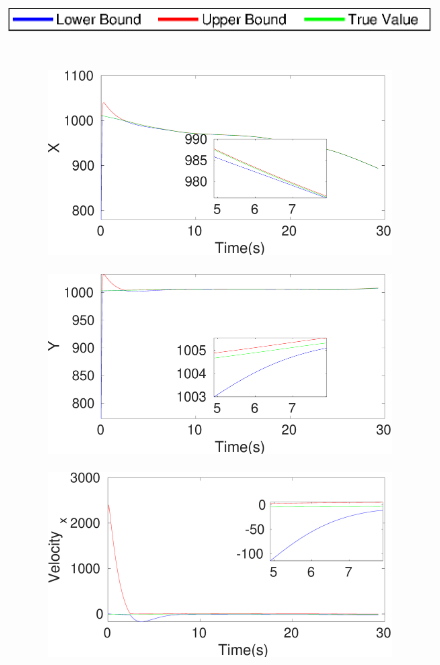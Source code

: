 \begin{figure}[h]
\includegraphics[scale=0.8]{figures/legend}\\\\
\begin{subfigure}{.5\linewidth}
\centering
\includegraphics[width=\linewidth]{figures/Prad/s3pmpradX}
\end{subfigure}
\begin{subfigure}{.5\linewidth}
\centering
\includegraphics[width=\linewidth]{figures/Prad/s3pmpradY}
\end{subfigure}
\begin{subfigure}{.5\linewidth}
\centering
\includegraphics[width=\linewidth]{figures/Prad/s3pmpradVelocity_x}

\end{subfigure}
\end{figure}
